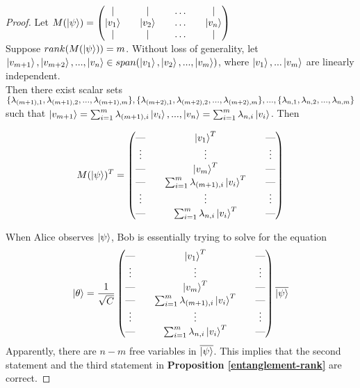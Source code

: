 \begin{proof}
Let $M(\ket{\psi})=
\begin{pmatrix}
\vert && \vert && \hdots && \vert\\
\ket{v_1} && \ket{v_2} && \hdots && \ket{v_n}\\
\vert && \vert && \hdots && \vert\\
\end{pmatrix}$\\
Suppose $rank(M(\ket{\psi}))=m$. Without loss of generality, let $\ket{v_{m+1}}, \ket{v_{m+2}},...,\ket{v_n} \in span(\ket{v_1},\ket{v_2},...,\ket{v_m})$, where $\ket{v_1}, ...\ket{v_m} $ are linearly independent.\\
Then there exist scalar sets $\{\lambda_{(m+1),1}, \lambda_{(m+1),2},..., \lambda_{(m+1),m}\}, \{\lambda_{(m+2),1}, \lambda_{(m+2),2},..., \lambda_{(m+2),m}\},...,\\
\{\lambda_{n,1}, \lambda_{n,2},..., \lambda_{n,m}\}$ such that $\ket{v_{m+1}}=\sum_{i=1}^m \lambda_{(m+1), i}\ket{v_i},...,\ket{v_n}=\sum_{i=1}^m \lambda_{n, i}\ket{v_i}$. Then

\begin{equation}
M(\ket{\psi})^T=\begin{pmatrix}
\text{---} && \ket{v_1}^T &&\text{---} \\
\vdots && \vdots && \vdots\\
\text{---} && \ket{v_m}^T && \text{---} \\
\text{---} && \sum_{i=1}^m \lambda_{(m+1), i}\ket{v_i}^T  &&\text{---} \\
\vdots && \vdots && \vdots \\
\text{---} && \sum_{i=1}^m \lambda_{n, i}\ket{v_i}^T &&\text{---} \\
\end{pmatrix}    
\end{equation}

When Alice observes $\ket{\psi}$, Bob is essentially trying to solve for the equation\\
\begin{equation}
\ket{\theta}= \frac{1}{\sqrt{C}}\begin{pmatrix}
\text{---} && \ket{v_1}^T &&\text{---} \\
\vdots && \vdots && \vdots\\
\text{---} && \ket{v_m}^T && \text{---} \\
\text{---} && \sum_{i=1}^m \lambda_{(m+1), i}\ket{v_i}^T  &&\text{---} \\
\vdots && \vdots && \vdots \\
\text{---} && \sum_{i=1}^m \lambda_{n, i}\ket{v_i}^T &&\text{---} \\
\end{pmatrix}\overline{\ket{\psi}}  
\end{equation}
Apparently, there are $n-m$ free variables in $\overline{\ket{\psi}}$. This implies that the second statement and the third statement in \textbf{Proposition \ref{entanglement-rank}} are correct.


\end{proof}
